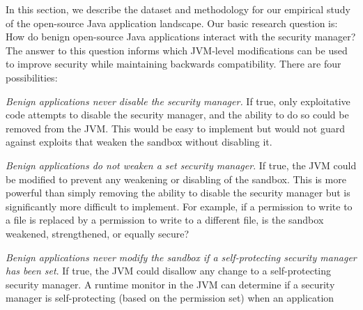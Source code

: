 \documentclass{sig-alternate}
\begin{document}
In this section, we describe the dataset and methodology for our empirical study
of the open-source Java application landscape. 
%
Our basic research question is: How do benign open-source Java applications interact
with the security manager? The answer to this question informs which JVM-level
modifications can be used to improve security
while maintaining backwards compatibility.  %
There are four possibilities:
\begin{flushenum}	\setlength{\parskip}{0pt}
  \setlength{\parsep}{0pt}
  \setlength{\itemsep}{0pt}
\item \textit{Benign applications never disable the security manager.}  If true,
  only exploitative code attempts to disable the security manager, and the ability to
  do so could be removed from the JVM.  This would be easy to implement but would not guard against exploits
  that weaken the sandbox without disabling it.
\item \textit{Benign applications do not weaken a set security manager}.  If
  true, the JVM could be modified to prevent any weakening or disabling of the 
  sandbox.  This is more powerful than simply removing the
  ability to disable the security manager but is significantly more difficult to
  implement.
  For example, if a permission to write to a file is
  replaced by a permission to write to a different file, is the sandbox
  weakened, strengthened, or equally secure?
\item \textit{Benign applications never modify the sandbox if a self-protecting
    security manager has been set}. If true, the JVM could
  disallow any change to a self-protecting security manager. A runtime monitor in the JVM can
  determine if a security manager is self-protecting (based on the permission set) when an application

\end{flushenum}
\end{document}
